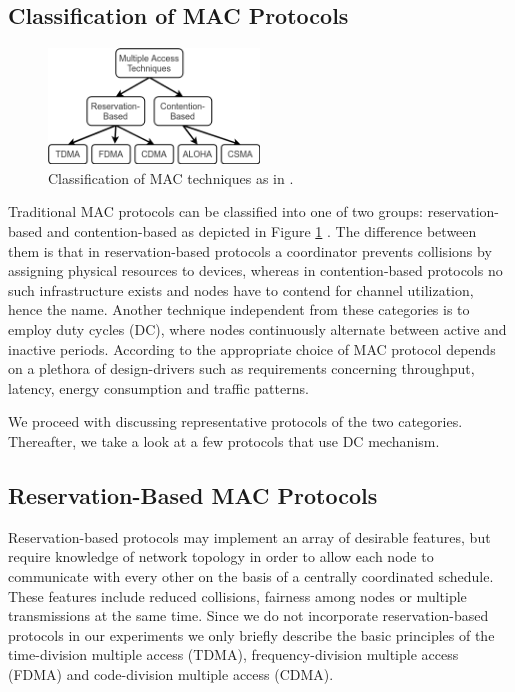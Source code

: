 \subsection{Classification of MAC Protocols}

\begin{figure}[tb] \label{fig:mac-classification}
	\begin{center}
		\includegraphics[width=0.5\textwidth]{pictures/mac_classification}
	\end{center}
	\caption[Classification of MAC techniques.]{Classification of MAC techniques as in \cite{Garg07}.}
\end{figure}

Traditional MAC protocols can be classified into one of two groups: reservation-based and contention-based as depicted in Figure \ref{fig:mac-classification} \cite{Garg07}. The difference between them is that in reservation-based protocols a coordinator prevents collisions by assigning physical resources to devices, whereas in contention-based protocols no such infrastructure exists and nodes have to contend for channel utilization, hence the name. Another technique independent from these categories is to employ duty cycles (DC), where nodes continuously alternate between active and inactive periods. According to \cite{Bachir10} the appropriate choice of MAC protocol depends on a plethora of design-drivers such as requirements concerning throughput, latency, energy consumption and traffic patterns. 

We proceed with discussing representative protocols of the two categories. Thereafter, we take a look at a few protocols that use DC mechanism.

\subsection{Reservation-Based MAC Protocols}
\label{sec:reservation-mac}

Reservation-based protocols may implement an array of desirable features, but require knowledge of network topology in order to allow each node to communicate with every other on the basis of a centrally coordinated schedule. These features include reduced collisions, fairness among nodes or multiple transmissions at the same time. Since we do not incorporate reservation-based protocols in our experiments we only briefly describe the basic principles of the time-division multiple access (TDMA), frequency-division multiple access (FDMA) and code-division multiple access (CDMA). 

